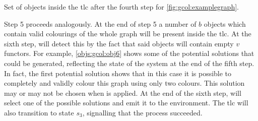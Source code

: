 \begin{cpobjectsfloat}
\begin{cpobjects}
    
    
    
    
    \cpobjectsline{\vdots}
    
    
    
\end{cpobjects}
\caption[Example set of objects after the fourth step for  \gls{cps} solution]{\label{objs:gcol:obj4}Set of objects inside the \gls{tlc} after the fourth step for \cref{fig:gcol:examplegraph}.}
\end{cpobjectsfloat}

Step 5 proceeds analogously.  At the end of step 5 a number of \(b\) objects which contain valid colourings of the whole graph will be present inside the \gls{tlc}.  At the sixth step,  will detect this by the fact that said objects will contain empty \(v\) functors.  For example, \cref{objs:gcol:obj6} shows some of the potential solutions that could be generated, reflecting the state of the system at the end of the fifth step.  In fact, the first potential solution shows that in this case it is possible to completely and validly colour this graph using only two colours.  This solution may or may not be chosen when  is applied.  At the end of the sixth step,  will select one of the possible solutions and emit it to the environment.  The \gls{tlc} will also transition to state \(s_3\), signalling that the process succeeded.

